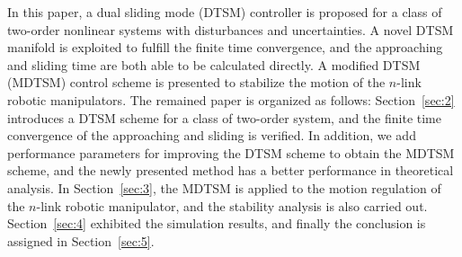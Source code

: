 \documentclass[3p]{elsarticle}
\theoremstyle{plain}
\theoremstyle{remark}
\begin{document}
In this paper, a dual sliding mode (DTSM) controller is proposed for a class of two-order nonlinear systems with disturbances and uncertainties. A novel DTSM manifold is exploited to fulfill the finite time convergence, and the approaching and sliding time are both able to be calculated directly. A modified DTSM (MDTSM) control scheme is presented to stabilize the motion of the $n$-link robotic manipulators. The remained paper is organized as follows: Section~\ref{sec:2} introduces a DTSM scheme for a class of two-order system, and the finite time convergence of the approaching and sliding is verified. In addition, we add performance parameters for improving the DTSM scheme to obtain the MDTSM scheme, and the newly presented method has a better performance in theoretical analysis. In Section~\ref{sec:3}, the MDTSM is applied to the motion regulation of the $n$-link robotic  manipulator, and the stability analysis is also carried out. Section~\ref{sec:4} exhibited the simulation results, and finally the conclusion is assigned in Section~\ref{sec:5}.
\end{document}
